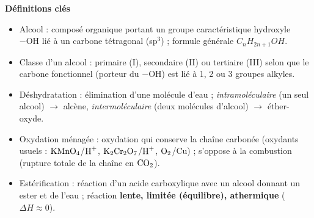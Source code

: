 \documentclass[11pt]{article}
\newcommand{\cle}[1]{{\popxbold\color{popdark}#1}}
\begin{document}
\begin{propriete}
\textbf{Définitions clés}
\begin{itemize}
  \item \cle{Alcool} : composé organique portant un groupe caractéristique hydroxyle $-\mathrm{OH}$ lié à un carbone tétragonal (sp$^3$) ; formule générale $C_nH_{2n+1}OH$.
  \item \cle{Classe d'un alcool} : primaire (I), secondaire (II) ou tertiaire (III) selon que le carbone fonctionnel (porteur du $-\mathrm{OH}$) est lié à 1, 2 ou 3 groupes alkyles.
  \item \cle{Déshydratation} : élimination d'une molécule d'eau ; \emph{intramoléculaire} (un seul alcool) $\to$ alcène, \emph{intermoléculaire} (deux molécules d'alcool) $\to$ éther-oxyde.
  \item \cle{Oxydation ménagée} : oxydation qui conserve la chaîne carbonée (oxydants usuels : $\ce{KMnO4}$/$\ce{H+}$, $\ce{K2Cr2O7}$/$\ce{H+}$, $\ce{O2}$/Cu) ; s'oppose à la combustion (rupture totale de la chaîne en $\ce{CO2}$).
  \item \cle{Estérification} : réaction d'un acide carboxylique avec un alcool donnant un ester et de l'eau ; réaction \textbf{lente, limitée (équilibre), athermique} ($\Delta H \approx 0$).
\end{itemize}


\end{propriete}
\end{document}
